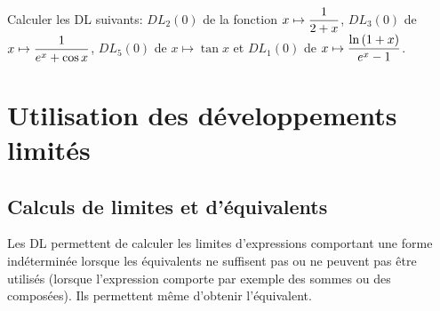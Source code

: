 \documentclass[a4paper, 11pt]{article}
\begin{document}
{{\footnotesize \begin{exercice} Calculer les DL suivants: $DL_2(0)$ de la fonction $x\mapsto \displaystyle\frac{1}{2+x}$, $DL_3(0)$ de $x\mapsto \displaystyle\frac{1}{e^x+\cos{x}}$, $DL_5(0)$ de $x\mapsto \tan{x}$ et $DL_1(0)$ de $x\mapsto \displaystyle\frac{\ln{(1+x)}}{e^x-1}$.
\end{exercice}
}





\section{Utilisation des d\'eveloppements limit\'es}

\subsection{Calculs de limites et d'\'equivalents}

\noindent Les DL permettent de calculer les limites d'expressions comportant une forme ind\'etermin\'ee lorsque les \'equivalents ne suffisent pas ou ne peuvent pas \^etre utilis\'es (lorsque l'expression comporte par exemple des sommes ou des compos\'ees). Ils permettent m\^eme d'obtenir l'\'equivalent.\\

}
\end{document}
